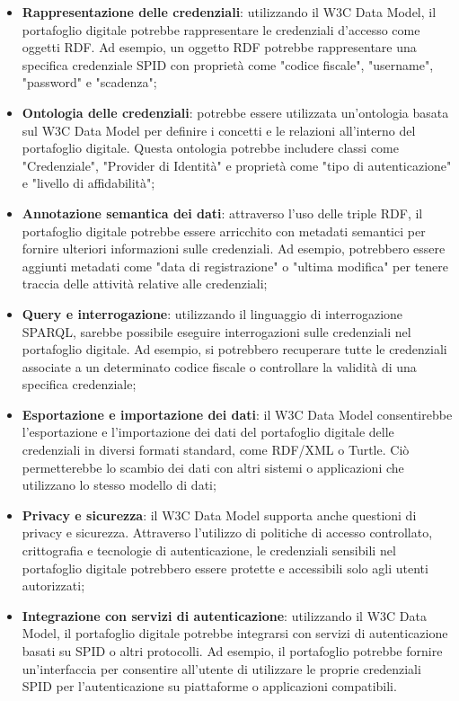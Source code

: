 \begin{itemize}
    \item \textbf{Rappresentazione delle credenziali}: utilizzando il W3C Data Model, il portafoglio digitale potrebbe rappresentare le credenziali d'accesso come oggetti RDF. Ad esempio, un oggetto RDF potrebbe rappresentare una specifica credenziale SPID con proprietà come "codice fiscale", "username", "password" e "scadenza";
    \item \textbf{Ontologia delle credenziali}: potrebbe essere utilizzata un'ontologia basata sul W3C Data Model per definire i concetti e le relazioni all'interno del portafoglio digitale. Questa ontologia potrebbe includere classi come "Credenziale", "Provider di Identità" e proprietà come "tipo di autenticazione" e "livello di affidabilità";
    \item \textbf{Annotazione semantica dei dati}: attraverso l'uso delle triple RDF, il portafoglio digitale potrebbe essere arricchito con metadati semantici per fornire ulteriori informazioni sulle credenziali. Ad esempio, potrebbero essere aggiunti metadati come "data di registrazione" o "ultima modifica" per tenere traccia delle attività relative alle credenziali;
    \item \textbf{Query e interrogazione}: utilizzando il linguaggio di interrogazione SPARQL, sarebbe possibile eseguire interrogazioni sulle credenziali nel portafoglio digitale. Ad esempio, si potrebbero recuperare tutte le credenziali associate a un determinato codice fiscale o controllare la validità di una specifica credenziale;
    \item \textbf{Esportazione e importazione dei dati}: il W3C Data Model consentirebbe l'esportazione e l'importazione dei dati del portafoglio digitale delle credenziali in diversi formati standard, come RDF/XML o Turtle. Ciò permetterebbe lo scambio dei dati con altri sistemi o applicazioni che utilizzano lo stesso modello di dati;
    \item \textbf{Privacy e sicurezza}: il W3C Data Model supporta anche questioni di privacy e sicurezza. Attraverso l'utilizzo di politiche di accesso controllato, crittografia e tecnologie di autenticazione, le credenziali sensibili nel portafoglio digitale potrebbero essere protette e accessibili solo agli utenti autorizzati;
    \item \textbf{Integrazione con servizi di autenticazione}: utilizzando il W3C Data Model, il portafoglio digitale potrebbe integrarsi con servizi di autenticazione basati su SPID o altri protocolli. Ad esempio, il portafoglio potrebbe fornire un'interfaccia per consentire all'utente di utilizzare le proprie credenziali SPID per l'autenticazione su piattaforme o applicazioni compatibili.
\end{itemize}

